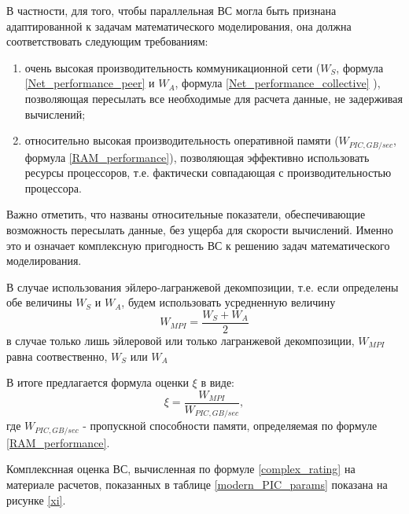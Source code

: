 В частности, для того, чтобы параллельная ВС могла быть признана адаптированной к задачам математического моделирования, она должна соответствовать следующим требованиям:
\begin{enumerate}
	\item очень высокая производительность коммуникационной сети ($W_S$, формула \ref{Net_performance_peer} и $W_A$, формула \ref{Net_performance_collective} ), позволяющая пересылать все необходимые для расчета данные, не задерживая вычислений;
	
	\item относительно высокая производительность оперативной памяти ($W_{PIC,GB/sec}$, формула \ref{RAM_performance}), позволяющая эффективно использовать ресурсы процессоров, т.е. фактически совпадающая с производительностью процессора.  	
\end{enumerate}

Важно отметить, что названы относительные показатели, обеспечивающие возможность пересылать данные, без ущерба для скорости вычислений. Именно это и означает  комплексную пригодность ВС к решению задач математического моделирования.

В случае использования эйлеро-лагранжевой декомпозиции, т.е. если определены обе величины $W_S$ и $W_A$, будем использовать усредненную величину
\begin{equation}
W_{MPI} = \frac{W_S + W_A}{2}
\end{equation}
в случае только лишь эйлеровой или только лагранжевой декомпозиции, $W_{MPI}$ равна соотвественно, $W_S$ или $W_A$

В итоге предлагается формула оценки $\xi$ в виде:
\begin{equation}
\xi = \frac{W_{MPI}} { W_{PIC,GB/sec}}, 
\label{complex_rating}
\end{equation}
где $W_{PIC,GB/sec}$  - пропускной способности памяти, определяемая по формуле \ref{RAM_performance}.

Комплекснная оценка ВС, вычисленная по формуле \ref{complex_rating}
на материале расчетов, показанных в таблице \ref{modern_PIC_params}
показана на рисунке \ref{xi}.

